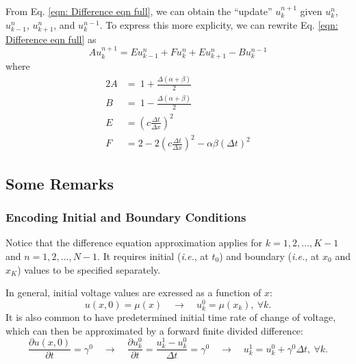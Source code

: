 \documentclass{article}
\begin{document}
From Eq. \ref{eqn: Difference eqn full}, we can obtain the ``update'' $u_{k}^{n+1}$
given $u_{k}^{n}$, $u_{k-1}^{n}$, $u_{k+1}^{n}$, and $u_{k}^{n-1}$.
To express this more explicity, we can rewrite Eq. \ref{eqn: Difference eqn full} as
\begin{equation}
   \label{eqn: Difference eqn short}
   A u_{k}^{n+1} = E u_{k-1}^{n} + F u_{k}^{n} + E u_{k+1}^{n} - B u_{k}^{n-1}
\end{equation}
where
\begin{alignat}{2}
   \label{eqn: A}
   A &=\ 1 + \frac{\Delta \left(\alpha + \beta\right)}{2} \\
   B &=\ 1 - \frac{\Delta \left(\alpha + \beta\right)}{2} \\
   E &= \left(c \frac{\Delta t}{\Delta x}\right)^{2} \\
   F &= 2 - 2 \left(c \frac{\Delta t}{\Delta x}\right)^{2} - \alpha \beta \left(\Delta t\right)^{2}
\end{alignat}

\subsection{Some Remarks}
\label{subsec: Some Remarks}

\subsubsection{Encoding Initial and Boundary Conditions}
\label{subsubsec: Encoding Initial and Boundary Conditions}

Notice that the difference equation approximation applies for $k=1,2,\ldots,K-1$ and $n=1,2,\ldots,N-1$.
It requires initial (\textit{i.e.}, at $t_{0}$) and boundary (\textit{i.e.}, at $x_{0}$ and $x_{K}$) values to be specified separately.

In general, initial voltage values are exressed as a function of $x$:
\begin{equation*}
   u \left(x,0\right) = \mu \left(x\right)
   \quad\longrightarrow\quad
   u_{k}^{0} = \mu \left(x_{k}\right),\ \forall k.
\end{equation*}
It is also common to have predetermined initial time rate of change of voltage,
which can then be approximated by a forward finite divided difference:
\begin{equation*}
   \frac{\partial u \left(x,0\right)}{\partial t} = \gamma^{0}
   \quad\longrightarrow\quad
   \frac{\partial u_{k}^{0}}{\partial t} =
   \frac{u_{k}^{1} - u_{k}^{0}}{\Delta t} = \gamma^{0}
   \quad\longrightarrow\quad
   u_{k}^{1} = u_{k}^{0} + \gamma^{0} \Delta t,\ \forall k.
\end{equation*}
\end{document}
